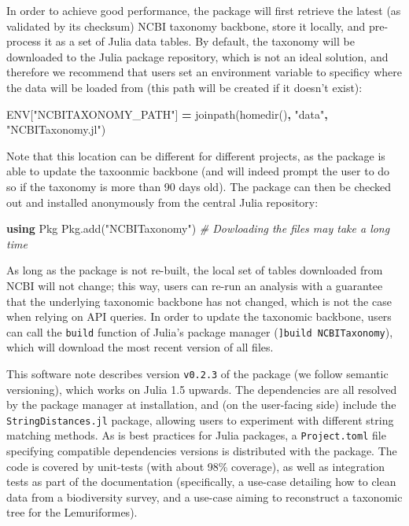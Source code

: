 \documentclass[11pt]{article}
\newenvironment{Shaded}{\begin{snugshade}}{\end{snugshade}}
\newcommand{\KeywordTok}[1]{\textcolor[rgb]{0.13,0.29,0.53}{\textbf{#1}}}
\newcommand{\ConstantTok}[1]{\textcolor[rgb]{0.00,0.00,0.00}{#1}}
\newcommand{\StringTok}[1]{\textcolor[rgb]{0.31,0.60,0.02}{#1}}
\newcommand{\CommentTok}[1]{\textcolor[rgb]{0.56,0.35,0.01}{\textit{#1}}}
\newcommand{\OperatorTok}[1]{\textcolor[rgb]{0.81,0.36,0.00}{\textbf{#1}}}
\newcommand{\NormalTok}[1]{#1}
\begin{document}
In order to achieve good performance, the package will first retrieve
the latest (as validated by its checksum) NCBI taxonomy backbone, store
it locally, and pre-process it as a set of Julia data tables. By
default, the taxonomy will be downloaded to the Julia package
repository, which is not an ideal solution, and therefore we recommend
that users set an environment variable to specificy where the data will
be loaded from (this path will be created if it doesn't exist):

\begin{Shaded}
\begin{Highlighting}[]
\ConstantTok{ENV}\NormalTok{[}\StringTok{"NCBITAXONOMY\_PATH"}\NormalTok{] }\OperatorTok{=}\NormalTok{ joinpath(homedir()}\OperatorTok{,} \StringTok{"data"}\OperatorTok{,} \StringTok{"NCBITaxonomy.jl"}\NormalTok{)}
\end{Highlighting}
\end{Shaded}

Note that this location can be different for different projects, as the
package is able to update the taxoonmic backbone (and will indeed prompt
the user to do so if the taxonomy is more than 90 days old). The package
can then be checked out and installed anonymously from the central Julia
repository:

\begin{Shaded}
\begin{Highlighting}[]
\KeywordTok{using}\NormalTok{ Pkg}
\NormalTok{Pkg.add(}\StringTok{"NCBITaxonomy"}\NormalTok{) }\CommentTok{\# Dowloading the files may take a long time}
\end{Highlighting}
\end{Shaded}

As long as the package is not re-built, the local set of tables
downloaded from NCBI will not change; this way, users can re-run an
analysis with a guarantee that the underlying taxonomic backbone has not
changed, which is not the case when relying on API queries. In order to
update the taxonomic backbone, users can call the \texttt{build}
function of Julia's package manager (\texttt{{]}build\ NCBITaxonomy}),
which will download the most recent version of all files.

This software note describes version \texttt{v0.2.3} of the package (we
follow semantic versioning), which works on Julia 1.5 upwards. The
dependencies are all resolved by the package manager at installation,
and (on the user-facing side) include the \texttt{StringDistances.jl}
package, allowing users to experiment with different string matching
methods. As is best practices for Julia packages, a
\texttt{Project.toml} file specifying compatible dependencies versions
is distributed with the package. The code is covered by unit-tests (with
about 98\% coverage), as well as integration tests as part of the
documentation (specifically, a use-case detailing how to clean data from
a biodiversity survey, and a use-case aiming to reconstruct a taxonomic
tree for the Lemuriformes).
\end{document}
